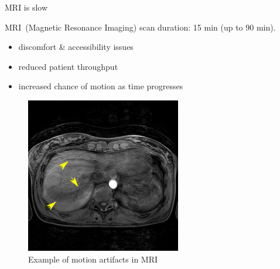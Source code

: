 \documentclass[aspectratio=169,xcolor=dvipsnames]{beamer}
\begin{document}
\begin{frame}{MRI is slow}
    \begin{multicols}{2}
        MRI~(Magnetic Resonance Imaging) scan duration: 15 min (up to 90 min).
    \begin{itemize}
        \item discomfort \& accessibility issues
        \item reduced patient throughput
        \item increased chance of motion as time progresses
    \end{itemize}
    \newpage
    \begin{figure}
        \centering
        \includegraphics[height=0.5\textheight]{Figures/intro_figures/motion_mri.png}
        \caption{Example of motion artifacts in MRI}
    \end{figure}
    \end{multicols}

\end{frame}
\end{document}

